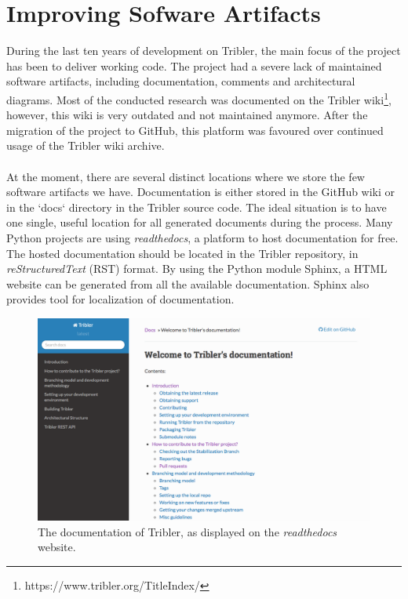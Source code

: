 \section{Improving Sofware Artifacts}
During the last ten years of development on Tribler, the main focus of the project has been to deliver working code. The project had a severe lack of maintained software artifacts, including documentation, comments and architectural diagrams. Most of the conducted research was documented on the Tribler wiki\footnote{https://www.tribler.org/TitleIndex/}, however, this wiki is very outdated and not maintained anymore. After the migration of the project to GitHub, this platform was favoured over continued usage of the Tribler wiki archive.\\\\
At the moment, there are several distinct locations where we store the few software artifacts we have. Documentation is either stored in the GitHub wiki or in the `docs` directory in the Tribler source code. The ideal situation is to have one single, useful location for all generated documents during the process. Many Python projects are using \emph{readthedocs}, a platform to host documentation for free. The hosted documentation should be located in the Tribler repository, in \emph{reStructuredText} (RST) format. By using the Python module Sphinx, a HTML website can be generated from all the available documentation. Sphinx also provides tool for localization of documentation.\\

\begin{figure}[h!]
	\centering
	\includegraphics[width=1.0\columnwidth]{images/improving_qa/readthedocs}
	\caption{The documentation of Tribler, as displayed on the \emph{readthedocs} website.}
	\label{fig:old-threading-model}
\end{figure}


